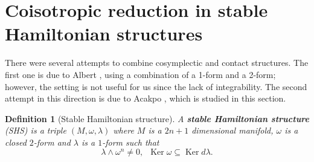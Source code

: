 \documentclass[12pt]{article}
\newtheorem{Def}{Definition}[section]
\renewcommand{\dim}{\operatorname{dim}}
\renewcommand{\ker}{\operatorname{Ker}}
\newcommand{\sectiontitle}{section}
\newcommand{\setsectiontitle}[1]{\renewcommand{\sectiontitle}{\footnotesize\textit{#1}}}
\begin{document}


\section{ Coisotropic reduction in stable Hamiltonian structures}\label{SHS}
\setsectiontitle{COISOTROPIC REDUCTION IN STABLE HAMILTONIAN STRUCTURES}
There were several attempts to combine cosymplectic and contact structures. The first one is due to Albert \cites{albert1989theoreme}, using a combination of a 1-form and a 2-form; however, the setting is not useful for us since the lack of integrability. The second attempt in this direction is due to Acakpo \cites{acakpo2022stable}, which is studied in this section.\\

\begin{Def}[Stable Hamiltonian structure] A \textbf{stable Hamiltonian structure} (SHS) is a triple $(M, \omega, \lambda)$ where $M$ is a $2n + 1$ dimensional manifold, $\omega$ is a closed $2$-form and $\lambda$ is a $1$-form such that $$\lambda \wedge \omega^n \neq 0, \,\,\, \ker \omega \subseteq \ker d\lambda.$$
\end{Def}
\end{document}
